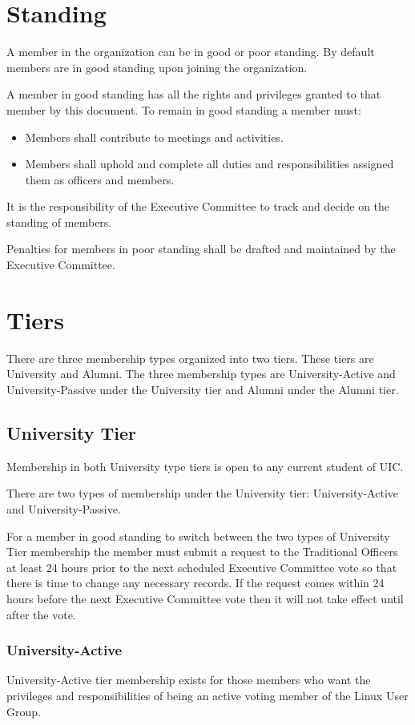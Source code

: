 \documentclass[letter]{report}
\begin{document}
\section{Standing}
A member in the organization can be in good or poor standing. By default members
are in good standing upon joining the organization.

A member in good standing has all the rights and privileges granted to that
member by this document. To remain in good standing a member must:
\begin{itemize}
	\item Members shall contribute to meetings and activities.
	\item Members shall uphold and complete all duties and responsibilities
	      assigned them as officers and members.
\end{itemize}
It is the responsibility of the Executive Committee to track and decide on the
standing of members.

Penalties for members in poor standing shall be drafted and
maintained by the Executive Committee.

\section{Tiers}
There are three membership types organized into two tiers. These tiers are
University and Alumni. The three membership types are University-Active and
University-Passive under the University tier and Alumni under the Alumni tier.

\subsection{University Tier}
Membership in both University type tiers is open to any current student of UIC.

There are two types of membership under the University tier: University-Active
and University-Passive.

For a member in good standing to switch between the two types of University Tier
membership the member must submit a request to the Traditional Officers at least
24 hours prior to the next scheduled Executive Committee vote so that there is
time to change any necessary records. If the request comes within 24 hours
before the next Executive Committee vote then it will not take effect until
after the vote.

\subsubsection{University-Active}
University-Active tier membership exists for those members who want the
privileges and responsibilities of being an active voting member of the Linux
User Group.
\end{document}
